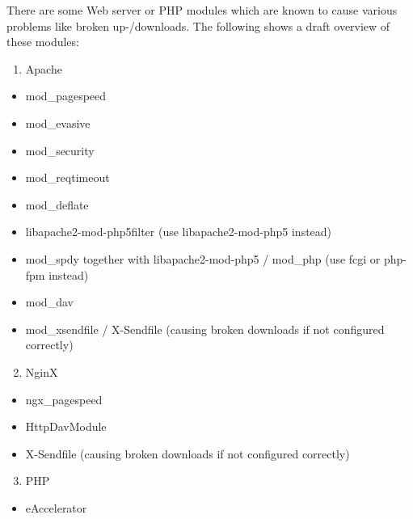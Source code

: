 \documentclass[letterpaper,10pt,english]{sphinxmanual}
\begin{document}
There are some Web server or PHP modules which are known to cause various
problems like broken up-/downloads. The following shows a draft overview of
these modules:
\begin{enumerate}
\item {} 
Apache

\end{enumerate}
\begin{itemize}
\item {} 
mod\_pagespeed

\item {} 
mod\_evasive

\item {} 
mod\_security

\item {} 
mod\_reqtimeout

\item {} 
mod\_deflate

\item {} 
libapache2-mod-php5filter (use libapache2-mod-php5 instead)

\item {} 
mod\_spdy together with libapache2-mod-php5 / mod\_php (use fcgi or php-fpm
instead)

\item {} 
mod\_dav

\item {} 
mod\_xsendfile / X-Sendfile (causing broken downloads if not configured
correctly)

\end{itemize}
\begin{enumerate}
\setcounter{enumi}{1}
\item {} 
NginX

\end{enumerate}
\begin{itemize}
\item {} 
ngx\_pagespeed

\item {} 
HttpDavModule

\item {} 
X-Sendfile (causing broken downloads if not configured correctly)

\end{itemize}
\begin{enumerate}
\setcounter{enumi}{2}
\item {} 
PHP

\end{enumerate}
\begin{itemize}
\item {} 
eAccelerator

\end{itemize}
\end{document}
